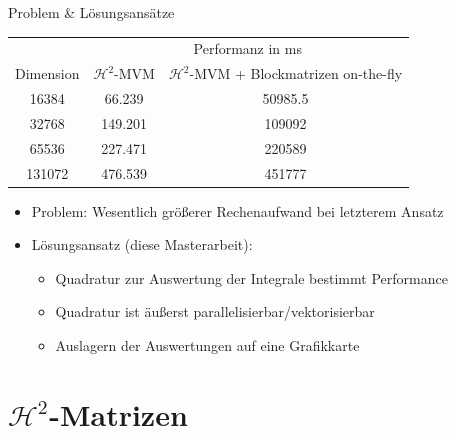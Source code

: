 \documentclass[10pt]{beamer}
\begin{document}
\begin{frame}{Problem \& Lösungsansätze}
  \begin{table}[h]
    \begin{tabular}{ccc} \toprule
                & \multicolumn{2}{c}{Performanz in ms} \\
      Dimension & \(\mathcal{H}^2\)-MVM & \(\mathcal{H}^2\)-MVM + Blockmatrizen on-the-fly \\ \midrule
          16384 &                66.239 &   50985.5 \\
          32768 &               149.201 &  109092 \\
          65536 &               227.471 &  220589 \\
         131072 &               476.539 &  451777 \\ \bottomrule
    \end{tabular}
  \end{table}
  \begin{itemize}
    \item Problem: Wesentlich größerer Rechenaufwand bei letzterem Ansatz
    \item Lösungsansatz (diese Masterarbeit):
    \begin{itemize}
      \item Quadratur zur Auswertung der Integrale bestimmt Performance
      \item Quadratur ist äußerst parallelisierbar/vektorisierbar
      \item Auslagern der Auswertungen auf eine Grafikkarte
    \end{itemize}
  \end{itemize}
\end{frame}

\section{\(\mathcal{H}^2\)-Matrizen}
\end{document}
